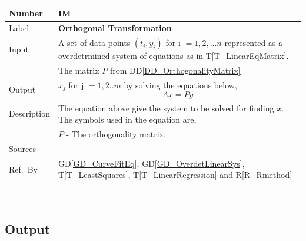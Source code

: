 \documentclass[12pt]{article}
\newcommand{\colAwidth}{0.13\textwidth}
\newcommand{\colBwidth}{0.82\textwidth}
\newcommand{\dref}[1]{GD\ref{#1}}
\newcommand{\ddref}[1]{DD\ref{#1}}
\newcommand{\tref}[1]{T\ref{#1}}
\newcounter{instnum} %
\newcommand{\rref}[1]{R\ref{#1}}
\begin{document}
\noindent
\begin{minipage}{\textwidth}
	\renewcommand*{\arraystretch}{1.5}
	\begin{tabular}{| p{\colAwidth} | p{\colBwidth}|}
		\hline
		\rowcolor[gray]{0.9}
		Number& IM{instnum}\theinstnum \label{IM_OrthogonalTransformation}\\
		\hline
		Label& \bf Orthogonal Transformation \\
		\hline
		
		Input
		& A set of data points $(t_i,y_i)$ for i $=1,2,...n$ represented as a overdetrmined system of equations as in \tref{T_LinearEqMatrix}.\\
		& The matrix $P$ from \ddref{DD_OrthogonalityMatrix}\\
		\hline
		
		Output
		& $x_j$ for j $=1,2..m$ by solving the equations below,
		\begin{equation*}
		Ax = Py
		\end{equation*}\\
		\hline
		
		Description & The equation above give the system to be solved for finding $x$. The symbols used in the equation are,\\
		& $P$ - The orthogonality matrix.\\
		\hline
	
		Sources& ~\cite{Health1997}\\
		\hline
		
		Ref.\ By &  \dref{GD_CurveFitEq}, \dref{GD_OverdetLinearSys}, \tref{T_LeastSquares}, \tref{T_LinearRegression} and \rref{R_Rmethod}\\
		\hline
	\end{tabular}
\end{minipage}\\







\subsection{Output} \label{sec_Output}    
\end{document}

